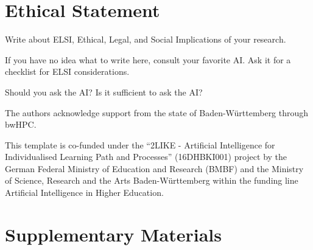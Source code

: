\documentclass[sigconf, nonacm]{acmart}
\begin{document}
\section*{Ethical Statement}

Write about ELSI, \ie Ethical, Legal, and Social Implications of your research.

\begin{tcolorbox}[title=Instructions: How to write an ELSI statement?]
If you have no idea what to write here, consult your favorite AI. Ask it for a checklist for ELSI considerations. 

Should you ask the AI?
Is it sufficient to ask the AI?
\end{tcolorbox}


\begin{acks}

The authors acknowledge support from the state of Baden-Württemberg through bwHPC.

This template is co-funded under the ``2LIKE - Artificial Intelligence for Individualised Learning Path and Processes'' (16DHBKI001)  project by the German Federal Ministry of Education and Research (BMBF) and the Ministry of Science, Research and the Arts Baden-Württemberg within the funding line Artificial Intelligence in Higher Education. 

\mysupervisorrole


\end{acks}





\newpage

\appendix

\section{Supplementary Materials}
\label{appendix:supplementarymaterials}
\end{document}
